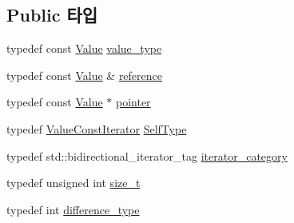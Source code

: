 \subsection*{Public 타입}
\begin{DoxyCompactItemize}
\item 
typedef const \hyperlink{class_json_1_1_value}{Value} \hyperlink{class_json_1_1_value_const_iterator_aa5f1707dcef4bfe73e23ddc14dbe760d}{value\+\_\+type}
\item 
typedef const \hyperlink{class_json_1_1_value}{Value} \& \hyperlink{class_json_1_1_value_const_iterator_aa9b05c6a37cd352ea1ee6e13b816f709}{reference}
\item 
typedef const \hyperlink{class_json_1_1_value}{Value} $\ast$ \hyperlink{class_json_1_1_value_const_iterator_a400136bd8bc09e9fddec0785fa2cff14}{pointer}
\item 
typedef \hyperlink{class_json_1_1_value_const_iterator}{Value\+Const\+Iterator} \hyperlink{class_json_1_1_value_const_iterator_a0c2e33e7eb5a80dd8709fb28ece83933}{Self\+Type}
\item 
typedef std\+::bidirectional\+\_\+iterator\+\_\+tag \hyperlink{class_json_1_1_value_iterator_base_a02fd11a4fbdc0007da1e8bcf5e6b83c3}{iterator\+\_\+category}
\item 
typedef unsigned int \hyperlink{class_json_1_1_value_iterator_base_a9d3a3c7ce5cdefe23cb486239cf07bb5}{size\+\_\+t}
\item 
typedef int \hyperlink{class_json_1_1_value_iterator_base_a4e44bf8cbd17ec8d6e2c185904a15ebd}{difference\+\_\+type}
\end{DoxyCompactItemize}
